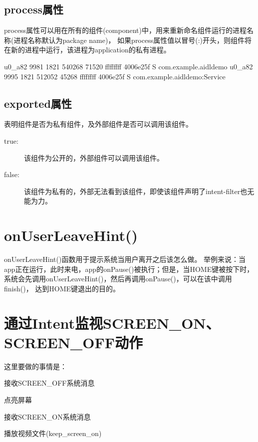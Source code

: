 ﻿\documentclass[a4paper,11pt]{article}
\begin{document}
  \subsection[process属性]{process属性}
  process属性可以用在所有的组件(component)中，用来重新命名组件运行的进程名称(进程名称默认为package name)，
  如果process属性值以冒号(:)开头，则组件将在新的进程中运行，该进程为application的私有进程。\par
  \begin{bashcode}
u0_a82    9981  1821  540268 71520 ffffffff 4006e25f S com.example.aidldemo
u0_a82    9995  1821  512052 45268 ffffffff 4006e25f S com.example.aidldemo:Service
  \end{bashcode}
  
  \subsection[exported属性]{exported属性}
  表明组件是否为私有组件，及外部组件是否可以调用该组件。
  \begin{description}
    \item[true:] 该组件为公开的，外部组件可以调用该组件。
    \item[false:] 该组件为私有的，外部无法看到该组件，即使该组件声明了intent-filter也无能为力。
  \end{description}

  \section[onUserLeaveHint()]{onUserLeaveHint()}
  onUserLeaveHint()函数用于提示系统当用户离开之后该怎么做。
  举例来说：当app正在运行，此时来电，app的onPause()被执行；但是，当HOME键被按下时，
  系统会先调用onUserLeaveHint()，然后再调用onPause()，可以在该中调用finish()，
  达到HOME键退出的目的。

  \section[通过Intent监视SCREEN\_ON、SCREEN\_OFF动作]{通过Intent监视SCREEN\_ON、SCREEN\_OFF动作}
  这里要做的事情是：
  \begin{coloredenumerate}
    \item 接收SCREEN\_OFF系统消息
    \item 点亮屏幕
    \item 接收SCREEN\_ON系统消息
    \item 播放视频文件(keep\_screen\_on)
  \end{coloredenumerate}
\end{document}
